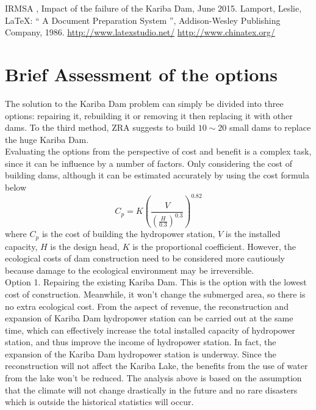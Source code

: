 \documentclass{mcmthesis}
\begin{document}
\begin{thebibliography}{99}
 IRMSA , Impact of the failure of the Kariba Dam, June 2015.
Lamport, Leslie,  \LaTeX{}: `` A Document Preparation System '',
Addison-Wesley Publishing Company, 1986.
\url{http://www.latexstudio.net/}
\url{http://www.chinatex.org/}
\end{thebibliography}

\clearpage
\section{Brief Assessment of the options}
\indent \indent The solution to the Kariba Dam problem can simply be divided into three options: repairing it, rebuilding it or removing it then replacing it with other dams. To the third method, ZRA suggests to build $10\sim20$ small dams to replace the huge Kariba Dam.\\
\indent Evaluating the options from the perspective of cost and benefit is a complex task, since it can be influence by a number of factors. Only considering the cost of building dams, although it can be estimated accurately by using the cost formula below \\
\[C_{p} = K\left(\frac{V}{\left(\frac{H}{0.3}\right)^{0.3}}\right)^{0.82}\]
where $C_{p}$ is the cost of building the hydropower station, $V$ is the installed capacity, $H$ is the design head, $K$ is the proportional coefficient. However, the ecological costs of dam construction need to be considered more cautiously because damage to the ecological environment may be irreversible.\\
\indent Option 1. Repairing the existing Kariba Dam. This is the option with the lowest cost of construction. Meanwhile, it won't change the submerged area, so there is no extra ecological cost. From the aspect of revenue, the reconstruction and expansion of Kariba Dam hydropower station can be carried out at the same time, which can effectively increase the total installed capacity of hydropower station, and thus improve the income of hydropower station. In fact, the expansion of the Kariba Dam hydropower station is underway. Since the reconstruction will not affect the Kariba Lake, the benefits from the use of water from the lake won't be reduced. The analysis above is based on the assumption that the climate will not change drastically in the future and no rare disasters which is outside the historical statistics will occur.\\
\end{document}

